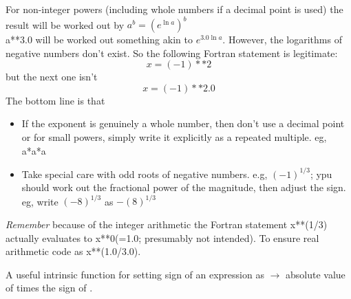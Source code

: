 \documentclass[class=book,crop=false]{standalone}
\begin{document}
    For non-integer powers (including whole numbers if a decimal point is used) the result will be worked out by $ \displaystyle a^{\displaystyle b}=(\displaystyle e^{\displaystyle\ln a})^{\displaystyle b} $\\
    a**3.0 will be worked out something akin to $ e^{\displaystyle3.0\ln a} $. 
    However, the logarithms of negative numbers don't exist. 
    So the following Fortran statement is legitimate:
    \[x=(-1)**2\]but the next one isn't\[x=(-1)**2.0\]
    The bottom line is that
    \begin{itemize}
        \item If the exponent is genuinely a whole number, then don't use a decimal point or for small powers, simply write it explicitly as a repeated multiple. eg, a*a*a
        \item Take special care with odd roots of negative numbers. e.g, $ (-1)^{1/3} $; ypu should work out the fractional power of the magnitude, then adjust the sign. eg, write $ (-8)^{1/3} $ as $ -(8)^{1/3} $
    \end{itemize}
    \emph{Remember} because of the integer arithmetic the Fortran statement x**(1/3) actually evaluates to x**0(=1.0; presumably not intended). To ensure real arithmetic code as x**(1.0/3.0).

    A useful intrinsic function for setting sign of an expression as  $ \to $ absolute value of  times the sign of .
    
\end{document}

